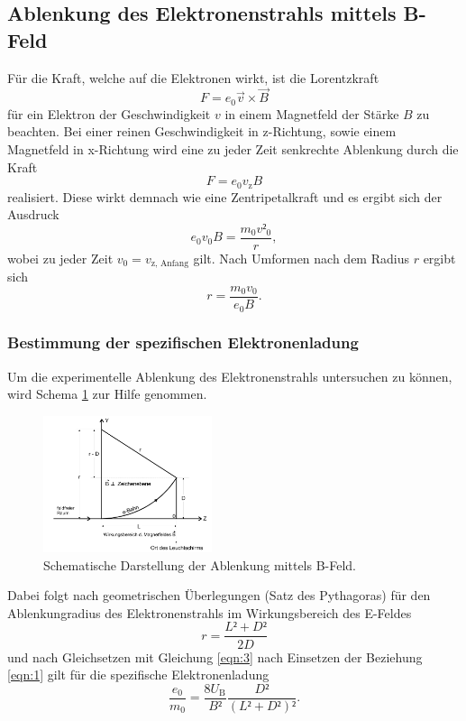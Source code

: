 \subsection{Ablenkung des Elektronenstrahls mittels B-Feld}
Für die Kraft, welche auf die Elektronen wirkt, ist die Lorentzkraft
\begin{equation}
  F = e_0 \vec{v} \times \vec{B}
\end{equation}
für ein Elektron der Geschwindigkeit $v$ in einem Magnetfeld der Stärke $B$ zu beachten.
Bei einer reinen Geschwindigkeit in z-Richtung, sowie einem Magnetfeld in x-Richtung wird eine zu jeder Zeit senkrechte Ablenkung durch die Kraft
\begin{equation}
  F = e_0 v_{\text{z}} B
\end{equation}
realisiert.
Diese wirkt demnach wie eine Zentripetalkraft und es ergibt sich der Ausdruck
\begin{equation}
  e_0 v_0 B = \frac{m_0 v²_0}{r},
\end{equation}
wobei zu jeder Zeit $v_0 = v_{\text{z, Anfang}}$ gilt.
Nach Umformen nach dem Radius $r$ ergibt sich
\begin{equation}
  r = \frac{m_0 v_0}{e_0 B}. \label{eqn:3}
\end{equation}
\clearpage

\subsubsection{Bestimmung der spezifischen Elektronenladung}
Um die experimentelle Ablenkung des Elektronenstrahls untersuchen zu können, wird Schema \ref{fig:2} zur Hilfe genommen.
\begin{figure}
  \centering
  \includegraphics[height=4cm]{ressources/schema2.png}
  \caption{Schematische Darstellung der Ablenkung mittels B-Feld. \cite{skript}}
  \label{fig:2}
\end{figure}
Dabei folgt nach geometrischen Überlegungen (Satz des Pythagoras) für den Ablenkungradius des Elektronenstrahls im Wirkungsbereich des E-Feldes
\begin{equation}
  r = \frac{L²+D²}{2D}
\end{equation}
und nach Gleichsetzen mit Gleichung \eqref{eqn:3} nach Einsetzen der Beziehung \eqref{eqn:1} gilt für die spezifische Elektronenladung
\begin{equation}
  \frac{e_0}{m_0} = \frac{8 U_{\text{B}}}{B²} \frac{D²}{(L²+D²)²}. \label{eqn:4}
\end{equation}


